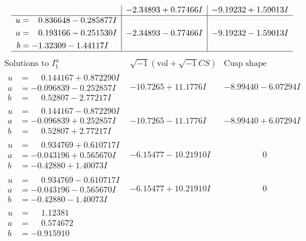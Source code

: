\documentclass[1p]{elsarticle_modified}
\theoremstyle{definition}
\newcommand{\I}{\sqrt{-1}}
\begin{document}
$$\begin{array}{c|c|c}
 & -2.34893 + 0.77466 I & -9.19232 + 1.59013 I \\ \hline\begin{aligned}
u &= \phantom{-}0.836648 - 0.285877 I \\
a &= \phantom{-}0.193166 - 0.251530 I \\
b &= -1.32309 - 1.44117 I\end{aligned}
 & -2.34893 - 0.77466 I & -9.19232 - 1.59013 I\\
 \hline 
 \end{array}$$\newpage$$\begin{array}{c|c|c}  
\text{Solutions to }I^u_{1}& \I (\text{vol} + \sqrt{-1}CS) & \text{Cusp shape}\\
 \hline 
\begin{aligned}
u &= \phantom{-}0.144167 + 0.872290 I \\
a &= -0.096839 - 0.252857 I \\
b &= \phantom{-}0.52807 - 2.77217 I\end{aligned}
 & -10.7265 + 11.1776 I & -8.99440 - 6.07294 I \\ \hline\begin{aligned}
u &= \phantom{-}0.144167 - 0.872290 I \\
a &= -0.096839 + 0.252857 I \\
b &= \phantom{-}0.52807 + 2.77217 I\end{aligned}
 & -10.7265 - 11.1776 I & -8.99440 + 6.07294 I \\ \hline\begin{aligned}
u &= \phantom{-}0.934769 + 0.610717 I \\
a &= -0.043196 + 0.565670 I \\
b &= -0.42880 + 1.40073 I\end{aligned}
 & -6.15477 - 10.21910 I & \phantom{-0.000000 } 0 \\ \hline\begin{aligned}
u &= \phantom{-}0.934769 - 0.610717 I \\
a &= -0.043196 - 0.565670 I \\
b &= -0.42880 - 1.40073 I\end{aligned}
 & -6.15477 + 10.21910 I & \phantom{-0.000000 } 0 \\ \hline\begin{aligned}
u &= \phantom{-}1.12381\phantom{ +0.000000I} \\
a &= \phantom{-}0.574672\phantom{ +0.000000I} \\
b &= -0.915910\phantom{ +0.000000I}\end{aligned}

\end{array}$$
\end{document}
